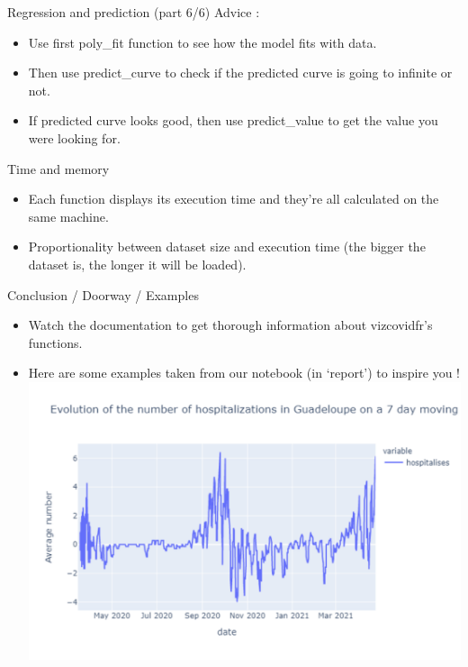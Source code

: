 \documentclass[
  ignorenonframetext,
]{beamer}
\providecommand{\tightlist}{%
  \setlength{\itemsep}{0pt}\setlength{\parskip}{0pt}}
\begin{document}
\begin{frame}{Regression and prediction (part 6/6)}
\protect\hypertarget{regression-and-prediction-part-66}{}
Advice :

\begin{itemize}
\tightlist
\item
  Use first poly\_fit function to see how the model fits with data.
  \pause
\item
  Then use predict\_curve to check if the predicted curve is going to
  infinite or not. \pause
\item
  If predicted curve looks good, then use predict\_value to get the
  value you were looking for.
\end{itemize}
\end{frame}

\begin{frame}{Time and memory}
\protect\hypertarget{time-and-memory}{}
\begin{itemize}
\tightlist
\item
  Each function displays its execution time and they're all calculated
  on the same machine. \pause
\item
  Proportionality between dataset size and execution time (the bigger
  the dataset is, the longer it will be loaded). \pause
\end{itemize}
\end{frame}

\begin{frame}{Conclusion / Doorway / Examples}
\protect\hypertarget{conclusion-doorway-examples}{}
\begin{itemize}
\tightlist
\item
  Watch the documentation to get thorough information about vizcovidfr's
  functions. \pause
\item
  Here are some examples taken from our notebook (in `report') to
  inspire you ! \pause \includegraphics{line_chart_guadeloupe_hosp.pdf}
\end{itemize}
\end{frame}
\end{document}
